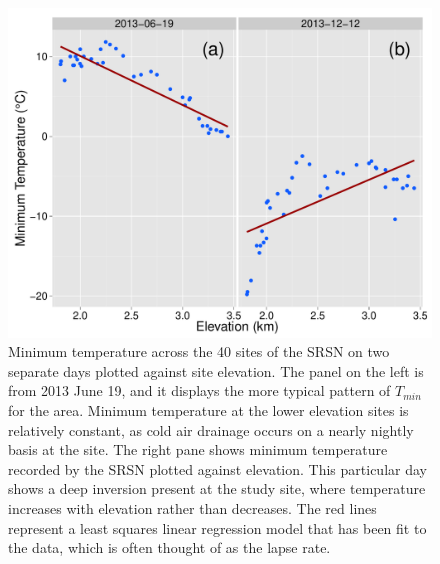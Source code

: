 \documentclass{ametsoc}
\begin{document}
\begin{figure}[ht]

\centerline{\includegraphics[width=39pc]{figure10_tmn-lapse.pdf}}

\caption{Minimum temperature across the 40 sites of the SRSN on two separate days plotted against site elevation. The panel on the left is from 2013 June 19, and it displays the more typical pattern of $T_{min}$ for the area. Minimum temperature at the lower elevation sites is relatively constant, as cold air drainage occurs on a nearly nightly basis at the site. The right pane shows minimum temperature recorded by the SRSN plotted against elevation. This particular day shows a deep inversion present at the study site, where temperature increases with elevation rather than decreases. The red lines represent a least squares linear regression model that has been fit to the data, which is often thought of as the lapse rate.}
\label{fig:10}
\end{figure}
\end{document}
